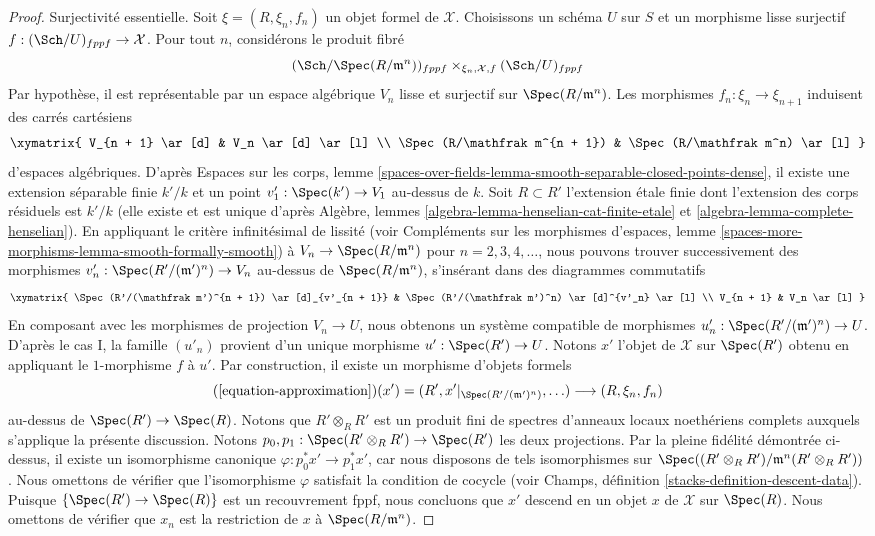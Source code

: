 \begin{proof}
\medskip\noindent
Surjectivité essentielle. Soit $\xi = (R, \xi_n, f_n)$ un objet formel de
$\mathcal{X}$. Choisissons un schéma $U$ sur $S$ et un morphisme lisse
surjectif $f : (\Sch/U)_{fppf} \to \mathcal{X}$. Pour tout $n$, considérons
le produit fibré
$$
(\Sch/\Spec(R/\mathfrak m^n))_{fppf}
\times_{\xi_n, \mathcal{X}, f}
(\Sch/U)_{fppf}
$$
Par hypothèse, il est représentable par un espace algébrique $V_n$ lisse et
surjectif sur $\Spec(R/\mathfrak m^n)$. Les morphismes
$f_n : \xi_n \to \xi_{n + 1}$ induisent des carrés cartésiens
$$
\xymatrix{
V_{n + 1} \ar[d] & V_n \ar[d] \ar[l] \\
\Spec(R/\mathfrak m^{n + 1}) & \Spec(R/\mathfrak m^n) \ar[l]
}
$$
 d'espaces algébriques. D'après Espaces sur les corps, lemme
\ref{spaces-over-fields-lemma-smooth-separable-closed-points-dense}, il existe
une extension séparable finie $k'/k$ et un point
$v'_1 : \Spec(k') \to V_1$ au-dessus de $k$. Soit $R \subset R'$ l'extension
étale finie dont l'extension des corps résiduels est $k'/k$ (elle existe et est
unique d'après Algèbre, lemmes
\ref{algebra-lemma-henselian-cat-finite-etale} et
\ref{algebra-lemma-complete-henselian}). En appliquant le critère infinitésimal
de lissité (voir Compléments sur les morphismes d'espaces, lemme
\ref{spaces-more-morphisms-lemma-smooth-formally-smooth}) à
$V_n \to \Spec(R/\mathfrak m^n)$ pour $n = 2, 3, 4, \ldots$, nous pouvons
trouver successivement des morphismes
$v'_n : \Spec(R'/(\mathfrak m')^n) \to V_n$ au-dessus de
$\Spec(R/\mathfrak m^n)$, s'insérant dans des diagrammes commutatifs
$$
\xymatrix{
\Spec(R'/(\mathfrak m')^{n + 1}) \ar[d]_{v'_{n + 1}} &
\Spec(R'/(\mathfrak m')^n) \ar[d]^{v'_n} \ar[l] \\
V_{n + 1} & V_n \ar[l]
}
$$
En composant avec les morphismes de projection $V_n \to U$, nous obtenons un
système compatible de morphismes
$u'_n : \Spec(R'/(\mathfrak m')^n) \to U$. D'après le cas I, la famille
$(u'_n)$ provient d'un unique morphisme $u' : \Spec(R') \to U$. Notons $x'$
l'objet de $\mathcal{X}$ sur $\Spec(R')$ obtenu en appliquant le $1$-morphisme
$f$ à $u'$. Par construction, il existe un morphisme d'objets formels
$$
(\ref{equation-approximation})(x') =
(R', x'|_{\Spec(R'/(\mathfrak m')^n)}, \ldots)
\longrightarrow
(R, \xi_n, f_n)
$$
au-dessus de $\Spec(R') \to \Spec(R)$. Notons que $R' \otimes_R R'$ est un
produit fini de spectres d'anneaux locaux noethériens complets auxquels
s'applique la présente discussion. Notons
$p_0, p_1 : \Spec(R' \otimes_R R') \to \Spec(R')$ les deux projections. Par la
pleine fidélité démontrée ci-dessus, il existe un isomorphisme canonique
$\varphi : p_0^*x' \to p_1^*x'$, car nous disposons de tels isomorphismes sur
$\Spec((R' \otimes_R R')/\mathfrak m^n(R' \otimes_R R'))$. Nous omettons de
vérifier que l'isomorphisme $\varphi$ satisfait la condition de cocycle (voir
Champs, définition \ref{stacks-definition-descent-data}). Puisque
$\{\Spec(R') \to \Spec(R)\}$ est un recouvrement fppf, nous concluons que
$x'$ descend en un objet $x$ de $\mathcal{X}$ sur $\Spec(R)$. Nous omettons de
vérifier que $x_n$ est la restriction de $x$ à
$\Spec(R/\mathfrak m^n)$.
\end{proof}

